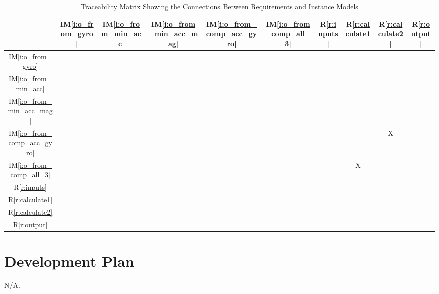 \documentclass[12pt]{article}
\newcommand{\iref}[1]{IM\ref{#1}} \newcounter{reqnum} %
\newcommand{\rref}[1]{R\ref{#1}} \newcounter{nfrnum} %
\begin{document}
\begin{table}[h!]
\centering
\begin{tabular}{|c|c|c|c|c|c|c|c|c|c|}
\hline
	&\iref{i:o_from_gyro}         &\iref{i:o_from_min_acc}      &\iref{i:o_from_min_acc_mag}
	&\iref{i:o_from_comp_acc_gyro} &\iref{i:o_from_comp_all_3} & \rref{r:inputs}   &
	\rref{r:calculate1}  & \rref{r:calculate2}& \rref{r:output}    \\
\hline
\iref{i:o_from_gyro}         & & & & & & & & & \\ \hline
\iref{i:o_from_min_acc}      & & & & & & & & & \\ \hline
\iref{i:o_from_min_acc_mag}  & & & & & & & & & \\ \hline
\iref{i:o_from_comp_acc_gyro}& & & & & & & &X& \\ \hline
\iref{i:o_from_comp_all_3}   & & & & & & &X& & \\ \hline
\rref{r:inputs}              & & & & & & & & & \\ \hline
\rref{r:calculate1}          & & & & & & & & & \\ \hline
\rref{r:calculate2}          & & & & & & & & & \\ \hline
\rref{r:output}              & & & & & & & & & \\ \hline
\end{tabular}
\caption{Traceability Matrix Showing the Connections Between Requirements and Instance Models}
\label{Table:R_trace}
\end{table}


\section{Development Plan} \label{sec:dev_plan}

N/A.
\end{document}
